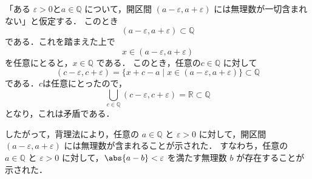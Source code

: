 \begin{tproof}[別解2]
    「ある $\varepsilon>0$と$a \in \mathbb{Q}$ について，開区間 $(a-\varepsilon,a+\varepsilon)$ には無理数が一切含まれない」と仮定する．
    このとき
    \[
        (a-\varepsilon,a+\varepsilon) \subset \mathbb{Q}
    \]
    である．これを踏まえた上で
    \[
        x \in  (a-\varepsilon,a+\varepsilon)
    \]
    を任意にとると，$ x \in \mathbb{Q} $ である．
    このとき，任意の$c \in \mathbb{Q}$ に対して
    \[
        (c-\varepsilon , c+\varepsilon) =\{ x +c -a \mid x \in (a-\varepsilon,a+\varepsilon) \} \subset \mathbb{Q}
    \]
    である．$c$は任意にとったので，
    \[
        \bigcup_{c \in \mathbb{Q}} (c-\varepsilon,c+\varepsilon) =\mathbb{R} \subset \mathbb{Q}
    \]
    となり，これは矛盾である．

    したがって，背理法により，任意の $a \in \mathbb{Q}$ と $\varepsilon > 0$ に対して，開区間 $(a-\varepsilon,a+\varepsilon)$ には無理数が含まれることが示された．
    すなわち，任意の $a \in \mathbb{Q}$ と $\varepsilon > 0$ に対して，$\abs{a-b}<\varepsilon$ を満たす無理数 $b$ が存在することが示された．
\end{tproof}





